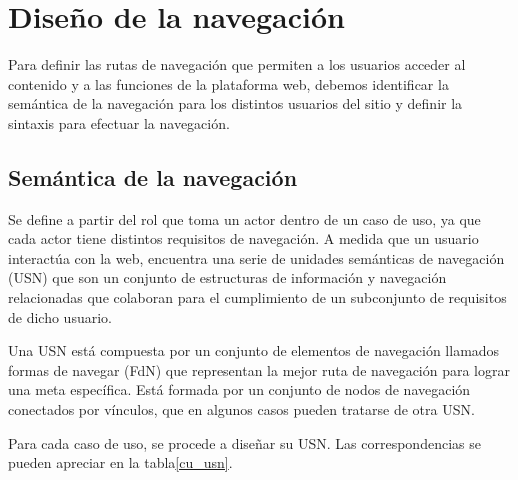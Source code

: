 
\section{Diseño de la navegación}
Para definir las rutas de navegación que permiten a los usuarios acceder al contenido y a las funciones de la plataforma web, debemos identificar la semántica de la navegación para los distintos usuarios del sitio y definir la sintaxis para efectuar la navegación.


\subsection{Semántica de la navegación}
Se define a partir del rol que toma un actor dentro de un caso de uso, ya que cada actor tiene distintos requisitos de navegación. A medida que un usuario interactúa con la web, encuentra una serie de unidades semánticas de navegación (USN) que son un conjunto de estructuras de información y navegación relacionadas que colaboran para el cumplimiento de un subconjunto de requisitos de dicho usuario.


Una USN está compuesta por un conjunto de elementos de navegación llamados formas de navegar (FdN) que representan la mejor ruta de navegación para lograr una meta específica. Está formada por un conjunto de nodos de navegación conectados por vínculos, que en algunos casos pueden tratarse de otra USN.


Para cada caso de uso, se procede a diseñar su USN. Las correspondencias se pueden apreciar en la tabla\ref{cu_usn}.


